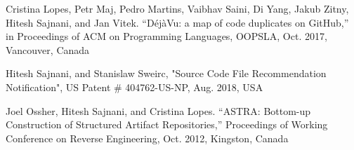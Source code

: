 \documentclass[a4paper]{article}
\begin{document}
\begin{small}
\begin{thebibliography}{}
Cristina Lopes, Petr Maj, Pedro Martins, Vaibhav Saini, Di Yang, Jakub Zitny, Hitesh Sajnani, and Jan Vitek. “DéjàVu: a map of code duplicates on GitHub,” in Proceedings of ACM on Programming Languages, OOPSLA, Oct. 2017, Vancouver, Canada


Hitesh Sajnani, and Stanislaw Sweirc, "Source Code File Recommendation Notification",   US Patent \# 404762-US-NP, Aug. 2018, USA

Joel Ossher, Hitesh Sajnani, and Cristina Lopes. “ASTRA: Bottom-up Construction
of Structured Artifact Repositories,” Proceedings of Working Conference on Reverse
Engineering, Oct. 2012, Kingston, Canada 

\end{thebibliography}
\end{small}
\end{document}
